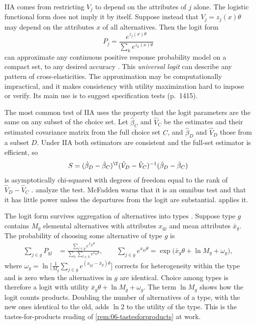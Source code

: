 \begin{remark}\label{rem:06-universal}
IIA comes from restricting $V_j$ to depend on the attributes of $j$ alone. The logistic functional form does
not imply it by itself. Suppose instead that $V_j = z_j(x)\theta$ may depend on the attributes $x$ of all
alternatives. Then the logit form
\begin{equation*}
P_j = \frac{e^{z_j(x)\theta}}{\sum_k e^{z_k(x)\theta}}
\end{equation*}
can approximate any continuous positive response probability model on a compact set, to any desired accuracy
\citep[eq.~3.18, pp.~1414--1415]{McFadden1984}. This \emph{universal logit} can describe any pattern of
cross-elasticities. The approximation may be computationally impractical, and it makes consistency with
utility maximization hard to impose or verify. Its main use is to suggest specification tests (p.~1415).
\end{remark}

The most common test of IIA uses the property that the logit parameters are the same on any subset of the
choice set. Let $\hat\beta_C$ and $\hat V_C$ be the estimates and their estimated covariance matrix from the full
choice set $C$, and $\hat\beta_D$ and $\hat V_D$ those from a subset $D$. Under IIA both estimators are consistent
and the full-set estimator is efficient, so
\begin{equation}\label{eq:06-hmtest}
S = (\hat\beta_D - \hat\beta_C)^\T(\hat V_D - \hat V_C)^{-1}(\hat\beta_D - \hat\beta_C)
\end{equation}
is asymptotically chi-squared with degrees of freedom equal to the rank of $\hat V_D - \hat V_C$
\citep[eq.~3.23, pp.~1417--1418]{McFadden1984}. \citet{HausmanMcFadden1984} analyze the test. McFadden warns
that it is an omnibus test and that it has little power unless the departures from the logit are substantial.
 applies it.

\begin{remark}\label{rem:06-aggregation}
The logit form survives aggregation of alternatives into types \citep[eqs.~3.19--3.20, p.~1415]{McFadden1984}.
Suppose type $g$ contains $M_g$ elemental alternatives with attributes $x_{gj}$ and mean attributes
$\bar x_g$. The probability of choosing some alternative of type $g$ is
\begin{align*}
\sum_{j \in g}P_{gj} &= \frac{\sum_{j \in g}e^{x_{gj}\theta}}{\sum_h\sum_{l \in h}e^{x_{hl}\theta}}, \qquad
\sum_{j\in g}e^{x_{gj}\theta} = \exp\big(\bar x_g\theta + \ln M_g + \omega_g\big),
\end{align*}
where $\omega_g = \ln\Big[\frac{1}{M_g}\sum_{j\in g}e^{(x_{gj} - \bar x_g)\theta}\Big]$ corrects for heterogeneity
within the type and is zero when the alternatives in $g$ are identical. Choice among types is therefore a logit
with utility $\bar x_g\theta + \ln M_g + \omega_g$. The term $\ln M_g$ shows how the logit counts products. Doubling
the number of alternatives of a type, with the new ones identical to the old, adds $\ln 2$ to the utility of
the type. This is the tastes-for-products reading of \cref{rem:06-tastesforproducts} at
work.
\end{remark}

